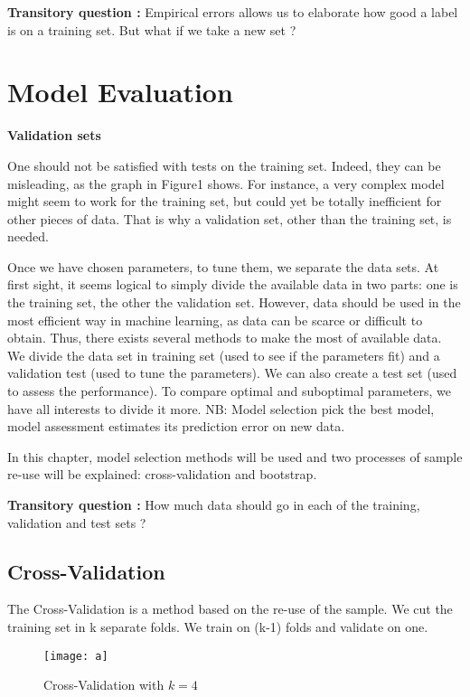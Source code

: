 \documentclass[a4paper,12pt]{article}
\begin{document}
\textbf{Transitory question :} Empirical errors allows us to elaborate how good a label is on a training set. But what if we take a new set ? 

\newpage
\section{Model Evaluation}

\textbf{Validation sets }

One should not be satisfied with tests on the training set. Indeed, they can be misleading, as the graph in Figure1 shows.
For instance, a very complex model might seem to work for the training set, but could yet be totally inefficient for other pieces of data. That is why a validation set, other than the training set, is needed.

Once we have chosen parameters, to tune them, we separate the data sets.
At first sight, it seems logical to simply divide the available data in two parts: one is the training set, the other the validation set. However, data should be used in the most efficient way in machine learning, as data can be scarce or difficult to obtain. Thus, there exists several methods to make the most of available data. We divide the data set in training set (used to see if the parameters fit) and a validation test   (used to tune the parameters). We can also create a test set (used to assess the performance).
To compare optimal and suboptimal parameters, we have all interests to divide it more. 
NB: Model selection pick the best model, model assessment estimates its prediction error on new data.

In this chapter, model selection methods will be used and two processes of sample re-use will be explained: cross-validation and bootstrap.

\textbf{Transitory question :} How much data should go in each of the training, validation and test sets ?  
\subsection{Cross-Validation}
The Cross-Validation   is a method based on the re-use of the sample. We cut the training set in k separate folds. We train on (k-1) folds and validate on one. 

\begin{figure}[!h]
\centering
\texttt{[image: a]}
\caption{\label{fig:1}Cross-Validation with $k=4$}
\end{figure}
\end{document}
